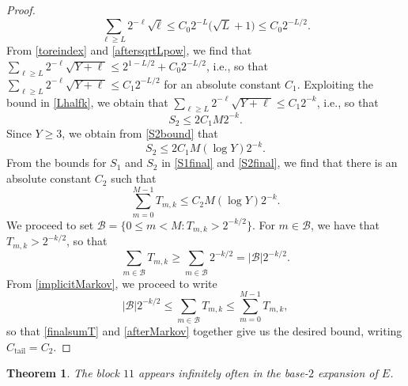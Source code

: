 \documentclass[12pt]{article}
\newtheorem{theorem}{Theorem}
\begin{document}
\begin{proof}
\begin{equation}\label{aftersqrtLpow}
 \sum_{\ell \geq L} 2^{-\ell} \sqrt{\ell} 
 \leq C_0 2^{-L} \big( \sqrt{L} + 1 \big) \leq C_{0} 2^{-L/2}. 
\end{equation}
 From \eqref{toreindex} and \eqref{aftersqrtLpow}, we find that 
 $ \sum_{\ell \geq L} 2^{-\ell} \sqrt{Y + \ell} \leq 2^{1 - L/2} + C_{0} 2^{-L/2}$, i.e., so that $ \sum_{\ell \geq L} 2^{-\ell} \sqrt{Y + \ell} 
 \leq C_{1} 2^{-L/2} $ for an absolute constant $C_{1}$. Exploiting the bound in \eqref{Lhalfk}, we obtain that $ \sum_{\ell \geq L} 
 2^{-\ell} \sqrt{Y + \ell} \leq C_{1} 2^{-k}$, i.e., so that 
\begin{equation}\label{S2bound} 
 S_{2} \leq 2 C_{1} M 2^{-k}. 
\end{equation}
 Since $Y \geq 3$, we obtain from \eqref{S2bound} that 
\begin{equation}\label{S2final} 
 S_2 \leq 2 C_1 M (\log Y) 2^{-k}. 
\end{equation}
 From the bounds for $S_1$ and $S_2$ in \eqref{S1final} and \eqref{S2final}, we find that there is an absolute constant $C_{2}$ such that 
\begin{equation}\label{finalsumT} 
 \sum_{m=0}^{M-1} T_{m, k} \leq C_{2} M (\log Y) 2^{-k}. 
\end{equation}
 We proceed to set
 $ \mathcal{B} = \big\{ 0 \leq m < M : T_{m, k} > 2^{-k/2} \big\}$. 
 For $m \in \mathcal{B}$, we have that $T_{m, k} > 2^{-k/2}$, so that 
\begin{equation}\label{implicitMarkov} 
 \sum_{m \in \mathcal{B}} T_{m, k} \geq \sum_{m \in \mathcal{B}} 2^{-k/2} = | \mathcal{B} | 2^{-k/2}. 
\end{equation}
 From \eqref{implicitMarkov}, we proceed to write
\begin{equation}\label{afterMarkov}
 |\mathcal{B}| 2^{-k/2} \leq \sum_{m \in \mathcal{B}} T_{m, k} \leq \sum_{m=0}^{M-1} T_{m, k}, 
\end{equation}
 so that \eqref{finalsumT} and \eqref{afterMarkov} together give us the desired bound, 
 writing $C_{\operatorname{tail}} = C_{2}$. 
\end{proof}

\begin{theorem}
 The block $11$ appears infinitely often in the base-$2$ expansion of $E$. 
\end{theorem}
\end{document}
